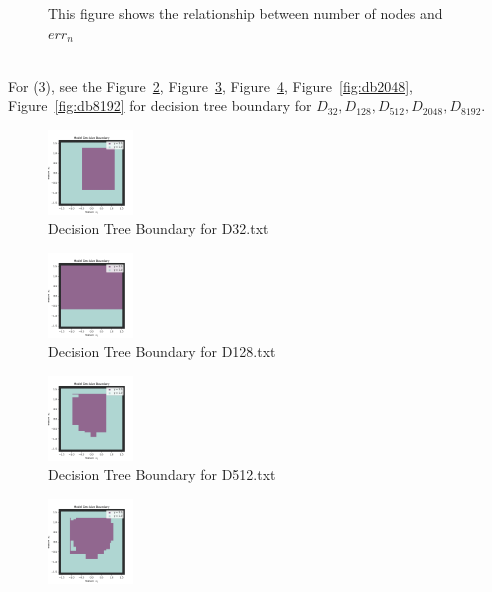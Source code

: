 \documentclass[a4paper]{article}
\theoremstyle{definition}
\newenvironment{soln}{
    \leavevmode\color{blue}\ignorespaces
}{}
\begin{document}
\begin{enumerate}
\begin{soln}
\begin{figure}
      \caption{This figure shows the relationship between number of nodes and $err_n$}
      \label{fig:errn}
    \end{figure}
    \\For (3), see the Figure~\ref{fig:db32}, Figure~\ref{fig:db128}, Figure~\ref{fig:db512}, Figure~\ref{fig:db2048}, Figure~\ref{fig:db8192} for decision tree boundary for $D_{32}, D_{128}, D_{512}, D_{2048}, D_{8192}$.
    \begin{figure}
      \centering
      \includegraphics[width=0.2\textwidth]{./data/db32.png}
      \caption{Decision Tree Boundary for D32.txt}
      \label{fig:db32}
    \end{figure}
    \begin{figure}
      \centering
      \includegraphics[width=0.2\textwidth]{./data/db128.png}
      \caption{Decision Tree Boundary for D128.txt}
      \label{fig:db128}
    \end{figure}
    \begin{figure}
      \centering
      \includegraphics[width=0.2\textwidth]{./data/db512.png}
      \caption{Decision Tree Boundary for D512.txt}
      \label{fig:db512}
    \end{figure}
    \begin{figure}
      \centering
      \includegraphics[width=0.2\textwidth]{./data/db2048.png}

\end{figure}
\end{soln}
\end{enumerate}
\end{document}
